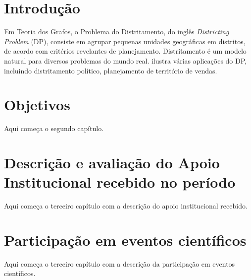 \documentclass[12pt]{report}
\begin{document}
%
%
\geraTitulo
%
%
%
%
\tableofcontents
\thispagestyle{empty}
\clearpage
%

\sectionfont{\scshape}

\chapter{Introdução}\label{chp:introducao} 
Em Teoria dos Grafos, o Problema do Distritamento, do inglês \textit{Districting Problem} (DP), 
consiste em agrupar pequenas unidades geográficas em distritos, de acordo com critérios 
revelantes de planejamento.
Distritamento é um modelo natural para diversos problemas do mundo real.
 ilustra várias aplicações do DP, incluindo distritamento 
político, planejamento de território de vendas. 

\chapter{Objetivos}\label{chp:objetivos}
Aqui começa o segundo capítulo.

\chapter{Descrição e avaliação do Apoio Institucional recebido no período}\label{chp:apoioInst}
Aqui começa o terceiro capítulo com a descrição do apoio institucional recebido.

\chapter{Participação em eventos científicos}\label{chp:particEvento}
Aqui começa o terceiro capítulo com a descrição da participação em eventos científicos.




\end{document}
